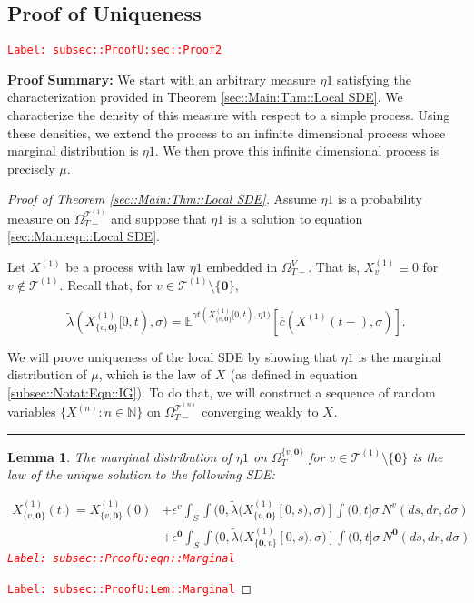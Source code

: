 \documentclass[12pt]{article}
\newcommand{\mb}{\mathbb}
\newcommand{\mc}{\mathcal}
\newcommand{\ov}{\overline}
\newcommand{\ep}{\epsilon}
\newcommand{\tr}{\textcolor{red}}
\newcommand{\labe}[1]{\tr{\texttt{Label: #1}}}
\newcommand{\pfsum}{\textbf{Proof Summary: }}
\newcommand{\ind}{\hspace{24pt}}
\newcommand{\lin}{\rule{\linewidth}{0.4 pt}}
\newcommand{\exmu}[2]{\mb{E}^{#1}\left[#2\right]}	%
\renewcommand{\root}{\mathbf{0}}				%
\renewcommand{\v}{v}							%
\renewcommand{\S}{S}							%
\newcommand{\s}{\sigma}							%
\newcommand{\ev}{\ep}							%
\newcommand{\T}{T}								%
\renewcommand{\t}{t}							%
\newcommand{\sset}{\Omega}						%
\renewcommand{\tt}{s}							%
\newcommand{\X}{X}								%
\newcommand{\vind}[1]{^{#1}}					%
\newcommand{\vsi}[1]{^{#1}}						%
\newcommand{\cind}[1]{_{#1}}					%
\newcommand{\tp}[1]{(#1)}						%
\newcommand{\tip}[1]{#1}						%
\newcommand{\ts}[1]{_{#1}}						%
\newcommand{\IGrg}{\ov{c}}						%
\newcommand{\tree}{\mc{T}}						%
\newcommand{\sln}[1]{^{(#1)}}						%
\newcommand{\poiss}{N}							%
\renewcommand{\r}{r}							%
\newcommand{\alt}[1]{\widetilde{#1}}			%
\newcommand{\m}{\mu}							%
\newcommand{\mmm}{\eta}							%
\newcommand{\cm}{\gamma}						%
\newcommand{\crate}{\alt{\lambda}}				%
\newtheorem{lem}[thms]{Lemma}
\begin{document}
\subsection{Proof of Uniqueness}
\label{subsec::ProofU:sec::Proof2}\labe{subsec::ProofU:sec::Proof2}

\pfsum We start with an arbitrary measure \(\mmm{}{}{1}\) satisfying the characterization provided in Theorem \ref{sec::Main:Thm::Local SDE}. We characterize the density of this measure with respect to a simple process. Using these densities, we extend the process to an infinite dimensional process whose marginal distribution is \(\mmm{}{}{1}\). We then prove this infinite dimensional process is precisely \(\m{}{}{}\).

\begin{proof}[Proof of Theorem \ref{sec::Main:Thm::Local SDE}]

Assume \(\mmm{}{}{1}\) is a probability measure on \(\sset\vsi{\tree\sln{1}}\ts{\T-}\) and suppose that \(\mmm{}{}{1}\) is a solution to equation \eqref{sec::Main:eqn::Local SDE}.

\ind Let \(\X\sln{1}\cind{}\tip{}\) be a process with law \(\mmm{}{}{1}\) embedded in \(\sset\vsi{V}\ts{\T-}\). That is, \(\X\sln{1}\cind{\v}\tip{} \equiv 0\) for \(\v \notin \tree\sln{1}\). Recall that, for \(\v \in \tree\sln{1}\setminus\{\root\}\),

\[\crate{}{}(\X\sln{1}\cind{\{\v,\root\}}\tip{[0,\t)},\s) = \exmu{\cm{\t}(\X\sln{1}\cind{\{\v,\root\}}\tip{[0,\t)},\mmm{}{}{1})}{\IGrg{}(\X\sln{1}\cind{}\tp{\t-},\s)}.\]

\ind We will prove uniqueness of the local SDE by showing that \(\mmm{}{}{1}\) is the marginal distribution of \(\m{}{}{}\), which is the law of \(\X\cind{}\tip{}\) (as defined in equation \eqref{subsec::Notat:Eqn::IG}). To do that, we will construct a sequence of random variables \(\{\X\sln{n}\cind{}\tip{}:n\in\mb{N}\}\) on \(\sset\vsi{\tree\sln{n}}\ts{\T-}\) converging weakly to \(\X\cind{}\tip{}\). 

\lin

\begin{lem}
The marginal distribution of \(\mmm{}{}{1}\) on \(\sset\vsi{\{\v,\root\}}\ts{\T}\) for \(\v \in \tree\sln{1}\setminus\{\root\}\) is the law of the unique solution to the following SDE:

\begin{align}
\X\sln{1}\cind{\{\v,\root\}}\tp{\t} = \X\sln{1}\cind{\{\v,\root\}}\tp{0} &+ \ev\vind{\v}\int_\S\int{(0,\crate{}{}(\X\sln{1}\cind{\{\v,\root\}}\tip{[0,\tt)},\s)]}\int{(0,\t]}\s\,\poiss\vind{\v}(d\tt,d\r,d\s)\nonumber\\
&+ \ev\vind{\root}\int_\S\int{(0,\crate{}{}(\X\sln{1}\cind{\{\root,\v\}}\tip{[0,\tt)},\s)]}\int{(0,\t]}\s\,\poiss\vind{\root}(d\tt,d\r,d\s)
\label{subsec::ProofU:eqn::Marginal}
\end{align}
\labe{subsec::ProofU:eqn::Marginal}
\label{subsec::ProofU:Lem::Marginal}
\end{lem}
\labe{subsec::ProofU:Lem::Marginal}


\end{proof}
\end{document}
